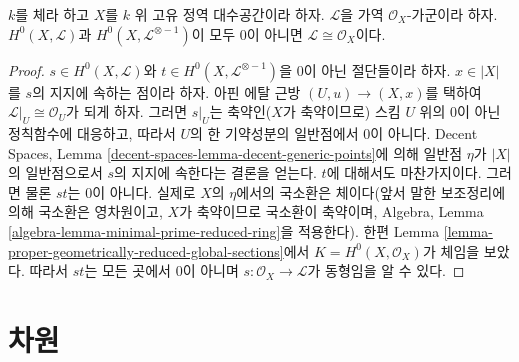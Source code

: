 \begin{lemma}
\label{lemma-characterize-trivial-pic-integral}
$k$를 체라 하고 $X$를 $k$ 위 고유 정역 대수공간이라 하자.
$\mathcal{L}$을 가역 $\mathcal{O}_X$-가군이라 하자.
$H^0(X, \mathcal{L})$과 $H^0(X, \mathcal{L}^{\otimes - 1})$이 모두
0이 아니면 $\mathcal{L} \cong \mathcal{O}_X$이다.
\end{lemma}

\begin{proof}
$s \in H^0(X, \mathcal{L})$와 $t \in H^0(X, \mathcal{L}^{\otimes - 1})$을
0이 아닌 절단들이라 하자. $x \in |X|$를 $s$의 지지에 속하는 점이라 하자.
아핀 에탈 근방 $(U, u) \to (X, x)$를 택하여
$\mathcal{L}|_U \cong \mathcal{O}_U$가 되게 하자. 그러면 $s|_U$는
축약인($X$가 축약이므로) 스킴 $U$ 위의 0이 아닌 정칙함수에 대응하고,
따라서 $U$의 한 기약성분의 일반점에서 0이 아니다.
Decent Spaces, Lemma \ref{decent-spaces-lemma-decent-generic-points}에 의해
일반점 $\eta$가 $|X|$의 일반점으로서 $s$의 지지에 속한다는 결론을 얻는다.
$t$에 대해서도 마찬가지이다. 그러면 물론 $st$는 0이 아니다. 실제로
$X$의 $\eta$에서의 국소환은 체이다(앞서 말한 보조정리에 의해 국소환은 영차원이고,
$X$가 축약이므로 국소환이 축약이며, Algebra, Lemma
\ref{algebra-lemma-minimal-prime-reduced-ring}을 적용한다). 한편 Lemma
\ref{lemma-proper-geometrically-reduced-global-sections}에서
$K = H^0(X, \mathcal{O}_X)$가 체임을 보았다. 따라서 $st$는 모든 곳에서
0이 아니며 $s : \mathcal{O}_X \to \mathcal{L}$가 동형임을 알 수 있다.
\end{proof}






\section{차원}
\label{section-dimension}

